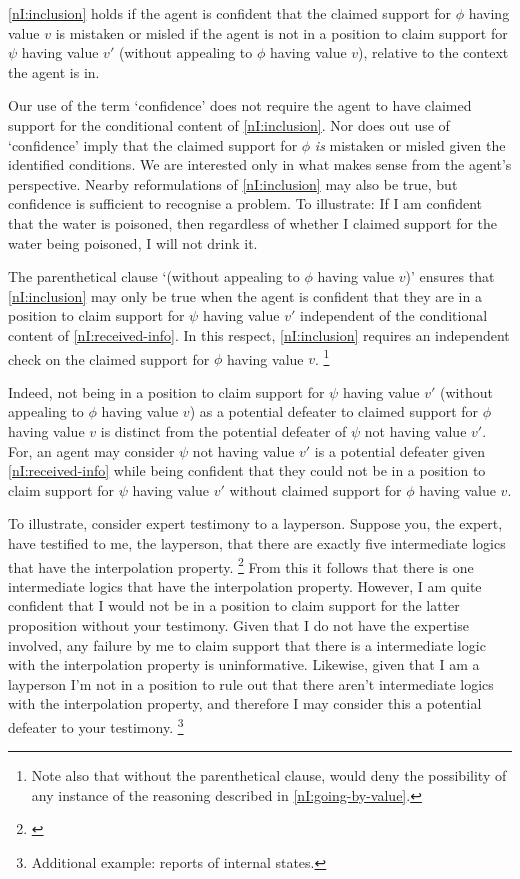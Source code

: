 \begin{note}
  \ref{nI:inclusion} holds if the agent is confident that the claimed support for \(\phi\) having value \(v\) is mistaken or misled if the agent is not in a position to claim support for \(\psi\) having value \(v'\) (without appealing to \(\phi\) having value \(v\)), relative to the context the agent is in.

  Our use of the term `confidence' does not require the agent to have claimed support for the conditional content of \ref{nI:inclusion}.
  Nor does out use of `confidence' imply that the claimed support for \(\phi\) \emph{is} mistaken or misled given the identified conditions.
  We are interested only in what makes sense from the agent's perspective.
  Nearby reformulations of \ref{nI:inclusion} may also be true, but confidence is sufficient to recognise a problem.
  To illustrate: If I am confident that the water is poisoned, then regardless of whether I claimed support for the water being poisoned, I will not drink it.

  The parenthetical clause `(without appealing to \(\phi\) having value \(v\))' ensures that \ref{nI:inclusion} may only be true when the agent is confident that they are in a position to claim support for \(\psi\) having value \(v'\) independent of the conditional content of \ref{nI:received-info}.
  In this respect, \ref{nI:inclusion} requires an independent check on the claimed support for \(\phi\) having value \(v\).\nolinebreak
  \footnote{
    Note also that without the parenthetical clause, \nI{} would deny the possibility of any instance of the reasoning described in \ref{nI:going-by-value}.
  }

  Indeed, not being in a position to claim support for \(\psi\) having value \(v'\) (without appealing to \(\phi\) having value \(v\)) as a potential defeater to claimed support for \(\phi\) having value \(v\) is distinct from the potential defeater of \(\psi\) not having value \(v'\).
  For, an agent may consider \(\psi\) not having value \(v'\) is a potential defeater given \ref{nI:received-info} while being confident that they could not be in a position to claim support for \(\psi\) having value \(v'\) without claimed support for \(\phi\) having value \(v\).

  To illustrate, consider expert testimony to a layperson.
  Suppose you, the expert, have testified to me, the layperson, that there are exactly five intermediate logics that have the interpolation property.\nolinebreak
  \footnote{\cite{Maksimova:1977un}}
  From this it follows that there is one intermediate logics that have the interpolation property.
  However, I am quite confident that I would not be in a position to claim support for the latter proposition without your testimony.
  Given that I do not have the expertise involved, any failure by me to claim support that there is a intermediate logic with the interpolation property is uninformative.
  Likewise, given that I am a layperson I'm not in a position to rule out that there aren't intermediate logics with the interpolation property, and therefore I may consider this a potential defeater to your testimony.\nolinebreak
  \footnote{
    Additional example: reports of internal states.

}
\end{note}
